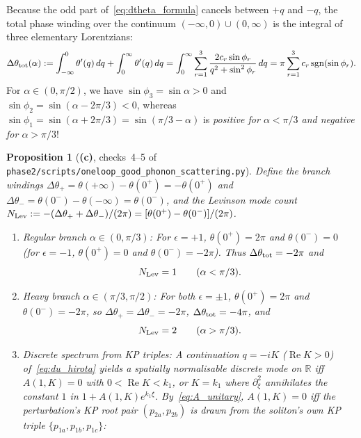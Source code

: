 \documentclass[11pt,a4paper]{article}
\newcommand{\Lc}{\textsf{\textbf{(c)}}}
\newcommand{\script}[1]{\texttt{phase2/\allowbreak scripts/\allowbreak #1}}
\newtheorem{proposition}{Proposition}[section]
\theoremstyle{remark}
\begin{document}
Because the odd part of~\eqref{eq:dtheta_formula} cancels between $+q$ and $-q$, the total phase winding over the continuum $(-\infty,0)\cup(0,\infty)$ is the integral of three elementary Lorentzians:
\begin{equation}\label{eq:levinson_integral}
\Delta\theta_{\rm tot}(\alpha):=\int_{-\infty}^0\theta'(q)\,dq+\int_0^\infty\theta'(q)\,dq
=\int_0^\infty\sum_{r=1}^3\frac{2c_r\sin\phi_r}{q^2+\sin^2\phi_r}\,dq
=\pi\sum_{r=1}^3 c_r\operatorname{sgn}(\sin\phi_r).
\end{equation}
For $\alpha\in(0,\pi/2)$, we have $\sin\phi_3=\sin\alpha>0$ and $\sin\phi_2=\sin(\alpha-2\pi/3)<0$, whereas $\sin\phi_1=\sin(\alpha+2\pi/3)=\sin(\pi/3-\alpha)$ is \emph{positive for $\alpha<\pi/3$ and negative for $\alpha>\pi/3$}!

\begin{proposition}[\Lc, checks~4--5 of \script{oneloop\_good\_phonon\_scattering.py}]\label{prop:levinson_discrete}
Define the branch windings $\Delta\theta_+=\theta(+\infty)-\theta(0^+)=-\theta(0^+)$ and $\Delta\theta_-=\theta(0^-)-\theta(-\infty)=\theta(0^-)$, and the Levinson mode count $N_{\rm Lev}:=-(\Delta\theta_++\Delta\theta_-)/(2\pi)=[\theta(0^+)-\theta(0^-)]/(2\pi)$.
\begin{enumerate}
\item \emph{Regular branch $\alpha\in(0,\pi/3)$:} For $\epsilon=+1$, $\theta(0^+)=2\pi$ and $\theta(0^-)=0$ (for $\epsilon=-1$, $\theta(0^+)=0$ and $\theta(0^-)=-2\pi$). Thus $\Delta\theta_{\rm tot}=-2\pi$ and
\begin{equation}\label{eq:nlev_reg}
N_{\rm Lev}=1\qquad (\alpha<\pi/3).
\end{equation}
\item \emph{Heavy branch $\alpha\in(\pi/3,\pi/2)$:} For both $\epsilon=\pm 1$, $\theta(0^+)=2\pi$ and $\theta(0^-)=-2\pi$, so $\Delta\theta_+=\Delta\theta_-=-2\pi$, $\Delta\theta_{\rm tot}=-4\pi$, and
\begin{equation}\label{eq:nlev_heavy}
N_{\rm Lev}=2\qquad (\alpha>\pi/3).
\end{equation}
\item \emph{Discrete spectrum from KP triples:} A continuation $q=-iK$ ($\operatorname{Re}K>0$) of~\eqref{eq:du_hirota} yields a spatially normalisable discrete mode on $\mathbb{R}$ iff $A(1,K)=0$ with $0<\operatorname{Re}K<k_1$, or $K=k_1$ where $\partial_\xi^2$ annihilates the constant $1$ in $1+A(1,K)e^{k_1\xi}$. By~\eqref{eq:A_unitary}, $A(1,K)=0$ iff the perturbation's KP root pair $(p_{2a},p_{2b})$ is drawn from the soliton's own KP triple $\{p_{1a},p_{1b},p_{1c}\}$:

\end{enumerate}
\end{proposition}
\end{document}
